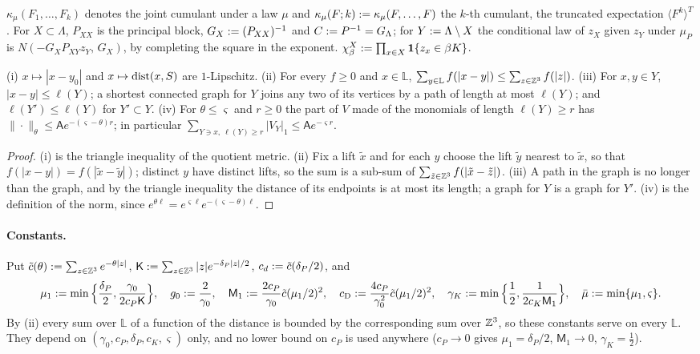 $\kappa_\mu(F_1,\dots,F_k)$ denotes the joint cumulant under a law $\mu$ and $\kappa_\mu(F;k):=\kappa_\mu(F,\dots,F)$ the $k$-th cumulant, the truncated expectation $\langle F^k\rangle^T$. For $X\subset\Lambda$, $P_{XX}$ is the principal block, $G_X:=(P_{XX})^{-1}$ and $C:= P^{-1}=G_\Lambda$; for $Y:=\Lambda\setminus X$ the conditional law of $z_X$ given $z_Y$ under $\mu_P$ is $N(-G_XP_{XY}z_Y,\,G_X)$, by completing the square in the exponent. $\chi^X_\beta:=\prod_{x\in X}\mathbf 1\{z_x\in\beta K\}$.

\begin{lemma}\label{rot:lem:R1lat}
\textup{(i)} $x\mapsto|x-y_0|$ and $x\mapsto\operatorname{dist}(x,S)$ are $1$-Lipschitz. \textup{(ii)} For every $f\ge0$ and $x\in\mathbb{L}$, $\sum_{y\in\mathbb{L}}f(|x-y|)\le\sum_{z\in\mathbb Z^3}f(|z|)$. \textup{(iii)} For $x,y\in Y$, $|x-y|\le\ell(Y)$; a shortest connected graph for $Y$ joins any two of its vertices by a path of length at most $\ell(Y)$; and $\ell(Y')\le\ell(Y)$ for $Y'\subset Y$. \textup{(iv)} For $\theta\le\varsigma$ and $r\ge0$ the part of $V$ made of the monomials of length $\ell(Y)\ge r$ has $\|\cdot\|_\theta\le\mathsf Ae^{-(\varsigma-\theta)r}$; in particular $\sum_{Y\ni x,\ \ell(Y)\ge r}|V_Y|_1\le\mathsf Ae^{-\varsigma r}$.
\end{lemma}
\begin{proof}
(i) is the triangle inequality of the quotient metric. (ii) Fix a lift $\tilde x$ and for each $y$ choose the lift $\tilde y$ nearest to $\tilde x$, so that $f(|x-y|)=f(|\tilde x-\tilde y|)$; distinct $y$ have distinct lifts, so the sum is a sub-sum of $\sum_{\tilde z\in\mathbb Z^3}f(|\tilde x-\tilde z|)$. (iii) A path in the graph is no longer than the graph, and by the triangle inequality the distance of its endpoints is at most its length; a graph for $Y$ is a graph for $Y'$. (iv) is the definition of the norm, since $e^{\theta\ell}=e^{\varsigma\ell}e^{-(\varsigma-\theta)\ell}$.
\end{proof}

\paragraph{Constants.} Put $\tilde c(\theta):=\sum_{z\in\mathbb Z^3}e^{-\theta|z|}$, $\mathsf K:=\sum_{z\in\mathbb Z^3}|z|e^{-\delta_P|z|/2}$, $c_d:=\tilde c(\delta_P/2)$, and
\begin{equation}\label{rot:eq:R1const}
\mu_1:=\min\Big\{\frac{\delta_P}2,\frac{\gamma_0}{2c_P\mathsf K}\Big\},\quad g_0:=\frac2{\gamma_0},\quad\mathsf M_1:=\frac{2c_P}{\gamma_0}\tilde c(\mu_1/2)^2,\quad c_{\mathrm D}:=\frac{4c_P}{\gamma_0^2}\tilde c(\mu_1/2)^2,\quad\gamma_K:=\min\Big\{\frac12,\frac1{2c_K\mathsf M_1}\Big\},\quad\bar\mu:=\min\{\mu_1,\varsigma\}.
\end{equation}
By (ii) every sum over $\mathbb{L}$ of a function of the distance is bounded by the corresponding sum over $\mathbb Z^3$, so these constants serve on every $\mathbb{L}$. They depend on $(\gamma_0,c_P,\delta_P,c_K,\varsigma)$ only, and no lower bound on $c_P$ is used anywhere ($c_P\to0$ gives $\mu_1=\delta_P/2$, $\mathsf M_1\to0$, $\gamma_K=\frac12$).

